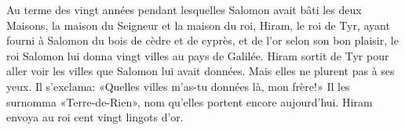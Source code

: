 Au terme des vingt années pendant lesquelles Salomon avait bâti les deux Maisons,
	la maison du Seigneur et la maison du roi,
	Hiram, le roi de Tyr, ayant fourni à Salomon du bois de cèdre et de cyprès,
		et de l’or selon son bon plaisir,
	le roi Salomon lui donna vingt villes au pays de Galilée.
Hiram sortit de Tyr pour aller voir les villes que Salomon lui avait données.
	Mais elles ne plurent pas à ses yeux.
Il s’exclama: «Quelles villes m’as-tu données là, mon frère!»
	Il les surnomma «Terre-de-Rien», nom qu’elles portent encore aujourd’hui.
Hiram envoya au roi cent vingt lingots d’or.
